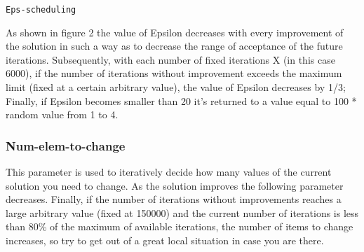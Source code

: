 \documentclass[11pt, oneside]{article}
\begin{document}
\qquad

\qquad

   
\begin{algorithm}
    \caption{\texttt{Eps-scheduling}}
    \begin{algorithmic}
		\EndIf{}
	 
        \Else{\texttt{}}

         \EndIf{}
		\EndIf{}
        \EndIf{}
    \end{algorithmic}
    \end{algorithm}

\qquad

As shown in figure 2 the value of Epsilon decreases with every improvement of the solution in such a way as to decrease the range of acceptance of the future iterations. Subsequently, with each number of fixed iterations X (in this case 6000), if the number of iterations without improvement exceeds the maximum limit (fixed at a certain arbitrary value), the value of Epsilon decreases by 1/3; Finally, if Epsilon becomes smaller than 20 it's returned to a value equal to 100 * random value from 1 to 4.




\pagebreak

\qquad

\subsubsection{Num-elem-to-change}



This parameter is used to iteratively decide how many values of the current solution you need to change. As the solution improves the following parameter decreases. Finally, if the number of iterations without improvements reaches a large arbitrary value (fixed at 150000) and the current number of iterations is less than 80\% of the maximum of available iterations, the number of items to change increases, so try to get out of a great local situation in case you are there.
\end{document}
